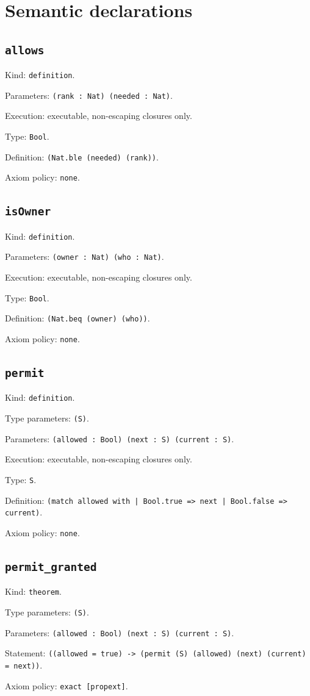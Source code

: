 \documentclass[11pt]{article}
\begin{document}
\section*{Semantic declarations}
\subsection*{\texttt{allows}}
\noindent Kind: \texttt{definition}.\par
\noindent Parameters: \texttt{(rank : Nat) (needed : Nat)}.\par
\noindent Execution: executable, non-escaping closures only.\par
\noindent Type: \texttt{Bool}.\par
\noindent Definition: \texttt{(Nat.ble (needed) (rank))}.\par
\noindent Axiom policy: \texttt{none}.\par
\subsection*{\texttt{isOwner}}
\noindent Kind: \texttt{definition}.\par
\noindent Parameters: \texttt{(owner : Nat) (who : Nat)}.\par
\noindent Execution: executable, non-escaping closures only.\par
\noindent Type: \texttt{Bool}.\par
\noindent Definition: \texttt{(Nat.beq (owner) (who))}.\par
\noindent Axiom policy: \texttt{none}.\par
\subsection*{\texttt{permit}}
\noindent Kind: \texttt{definition}.\par
\noindent Type parameters: \texttt{(S)}.\par
\noindent Parameters: \texttt{(allowed : Bool) (next : S) (current : S)}.\par
\noindent Execution: executable, non-escaping closures only.\par
\noindent Type: \texttt{S}.\par
\noindent Definition: \texttt{(match allowed with | Bool.true => next | Bool.false => current)}.\par
\noindent Axiom policy: \texttt{none}.\par
\subsection*{\texttt{permit\_granted}}
\noindent Kind: \texttt{theorem}.\par
\noindent Type parameters: \texttt{(S)}.\par
\noindent Parameters: \texttt{(allowed : Bool) (next : S) (current : S)}.\par
\noindent Statement: \texttt{((allowed = true) -> (permit (S) (allowed) (next) (current) = next))}.\par
\noindent Axiom policy: \texttt{exact [propext]}.\par
\end{document}
